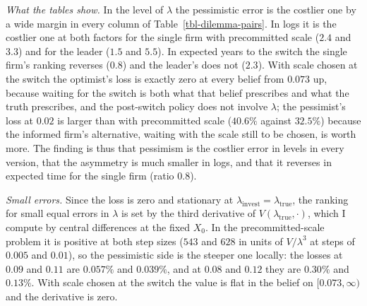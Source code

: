 \documentclass[
  11pt,
  letterpaper,
]{scrartcl}
\begin{document}
\emph{What the tables show.} In the level of \(\lambda\) the pessimistic
error is the costlier one by a wide margin in every column of
Table~\ref{tbl-dilemma-pairs}. In logs it is the costlier one at both
factors for the single firm with precommitted scale (\(2.4\) and
\(3.3\)) and for the leader (\(1.5\) and \(5.5\)). In expected years to
the switch the single firm's ranking reverses (\(0.8\)) and the leader's
does not (\(2.3\)). With scale chosen at the switch the optimist's loss
is exactly zero at every belief from \(0.073\) up, because waiting for
the switch is both what that belief prescribes and what the truth
prescribes, and the post-switch policy does not involve \(\lambda\); the
pessimist's loss at \(0.02\) is larger than with precommitted scale
(\(40.6\%\) against \(32.5\%\)) because the informed firm's alternative,
waiting with the scale still to be chosen, is worth more. The finding is
thus that pessimism is the costlier error in levels in every version,
that the asymmetry is much smaller in logs, and that it reverses in
expected time for the single firm (ratio \(0.8\)).

\emph{Small errors.} Since the loss is zero and stationary at
\(\lambda_{\text{invest}} = \lambda_{\text{true}}\), the ranking for
small equal errors in \(\lambda\) is set by the third derivative of
\(V(\lambda_{\text{true}}, \cdot)\), which I compute by central
differences at the fixed \(X_0\). In the precommitted-scale problem it
is positive at both step sizes (\(543\) and \(628\) in units of
\(V/\lambda^3\) at steps of \(0.005\) and \(0.01\)), so the pessimistic
side is the steeper one locally: the losses at \(0.09\) and \(0.11\) are
\(0.057\%\) and \(0.039\%\), and at \(0.08\) and \(0.12\) they are
\(0.30\%\) and \(0.13\%\). With scale chosen at the switch the value is
flat in the belief on \([0.073, \infty)\) and the derivative is zero.
\end{document}
